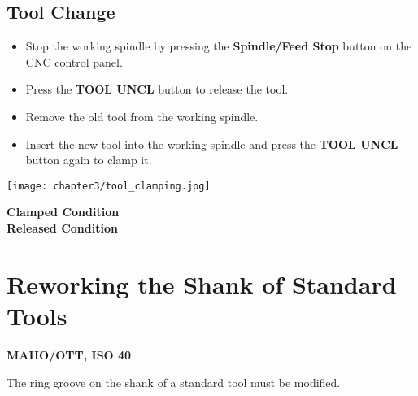 \vspace{0.5cm}

\subsection{Tool Change} \footnotemark


\begin{itemize}
    \item Stop the working spindle by pressing the \textbf{Spindle/Feed Stop} button on the CNC control panel.
    \item Press the \textbf{TOOL UNCL} button to release the tool.
    \item Remove the old tool from the working spindle.
    \item Insert the new tool into the working spindle and press the \textbf{TOOL UNCL} button again to clamp it.
\end{itemize}


\vspace{0.5cm}

\begin{minipage}{0.6\textwidth}
    \centering
    \texttt{[image: chapter3/tool\_clamping.jpg]}
\end{minipage}%
\begin{minipage}{0.4\textwidth}
   \textbf{Clamped Condition}
    \vspace{3.2cm}\\
   \textbf{Released Condition}
\end{minipage}

\section{Reworking the Shank of Standard Tools}

\textbf{MAHO/OTT, ISO 40}

\vspace{.5cm}

The ring groove on the shank of a standard tool must be modified.

\vspace{0.5cm}

